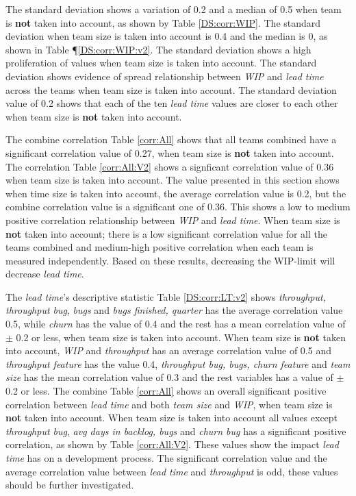 \documentclass[UKenglish]{ifimaster}  %
\begin{document}
The standard deviation shows a variation of 0.2 and a median of 0.5 when team is \textbf{not} taken into account, as shown by Table \ref{DS:corr:WIP}. The standard deviation when team size is taken into account is 0.4 and the median is 0, as shown in Table ¶\ref{DS:corr:WIP:v2}. The standard deviation shows a high proliferation of values when team size is taken into account. The standard deviation shows evidence of spread relationship between \textit{WIP} and \textit{lead time} across the teams  when team size is taken into account.   The standard deviation value of 0.2 shows that  each of the ten \textit{lead time} values are closer to each other when team size is \textbf{not} taken into account.  

The combine correlation Table \ref{corr:All} shows that all teams combined have a significant correlation value of 0.27, when team size is \textbf{not} taken into account.  The correlation Table \ref{corr:All:V2} shows a signficant correlation value of 0.36 when team size is taken into account. The value presented in this section shows when time size is taken into account, the average correlation value is 0.2, but the combine correlation value is a significant one of 0.36. This shows a low to medium positive correlation relationship between \textit{WIP} and \textit{lead time}. When team size is \textbf{not} taken into account; there is a low significant correlation value for all the teams combined and medium-high positive correlation when each team is measured independently. Based on these results, decreasing the WIP-limit will decrease \textit{lead time}.


The \textit{lead time}'s descriptive statistic Table \ref{DS:corr:LT:v2} shows \textit{throughput, throughput bug}, \textit{bugs} and  \textit{bugs finished, quarter}  has the average correlation value 0.5, while \textit{churn} has the value of 0.4 and the rest has a mean correlation value of $\pm$ 0.2 or less, when team size is taken into account. When team size is \textbf{not} taken into account, \textit{WIP} and \textit{throughput} has an average correlation value of 0.5 and \textit{throughput feature} has the value 0.4, \textit{throughput bug, bugs, churn feature} and \textit{team size} has the mean correlation value of 0.3 and the rest variables has a value of $\pm$ 0.2 or less. The combine Table \ref{corr:All} shows an overall significant positive correlation between \textit{lead time} and both \textit{team size} and \textit{WIP}, when team size is \textbf{not} taken into account. When team size is taken into account all values except \textit{throughput bug}, \textit{avg days in backlog, bugs} and \textit{churn bug} has a significant positive correlation, as shown by Table \ref{corr:All:V2}. These values show the impact \textit{lead time} has on a development process.  The significant correlation value and the average correlation value between \textit{lead time} and \textit{throughput} is odd, these values should be further investigated. 
\end{document}

